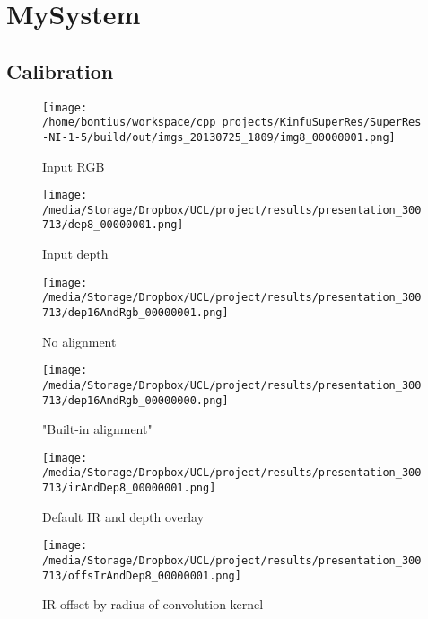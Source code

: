 %
%
%



\section{MySystem}

\subsection{Calibration}

\begin{figure}[h!]\centering
    \begin{minipage}[b]{0.49\linewidth}
        \texttt{[image: /home/bontius/workspace/cpp\_projects/KinfuSuperRes/SuperRes-NI-1-5/build/out/imgs\_20130725\_1809/img8\_00000001.png]}
        \caption{Input RGB}
    \end{minipage}
    \begin{minipage}[b]{0.49\linewidth}
        \texttt{[image: /media/Storage/Dropbox/UCL/project/results/presentation\_300713/dep8\_00000001.png]}
		\caption{Input depth}
    \end{minipage}
\end{figure}

\begin{figure}[h!]\centering
	\begin{minipage}[b]{0.49\linewidth}
		\texttt{[image: /media/Storage/Dropbox/UCL/project/results/presentation\_300713/dep16AndRgb\_00000001.png]}
		\caption{No alignment}
	\end{minipage}
	\begin{minipage}[b]{0.49\linewidth}
		\texttt{[image: /media/Storage/Dropbox/UCL/project/results/presentation\_300713/dep16AndRgb\_00000000.png]}
		\caption{"Built-in alignment"}
	\end{minipage}
\end{figure}


\begin{figure}[h!]\centering
    \begin{minipage}[b]{0.49\linewidth}
    		\label{fig:ir}
        \texttt{[image: /media/Storage/Dropbox/UCL/project/results/presentation\_300713/irAndDep8\_00000001.png]}
        \caption{Default IR and depth overlay}
    \end{minipage}
    \begin{minipage}[b]{0.49\linewidth}
        \texttt{[image: /media/Storage/Dropbox/UCL/project/results/presentation\_300713/offsIrAndDep8\_00000001.png]}
        \caption{IR offset by radius of convolution kernel}
    \end{minipage}
\end{figure}

